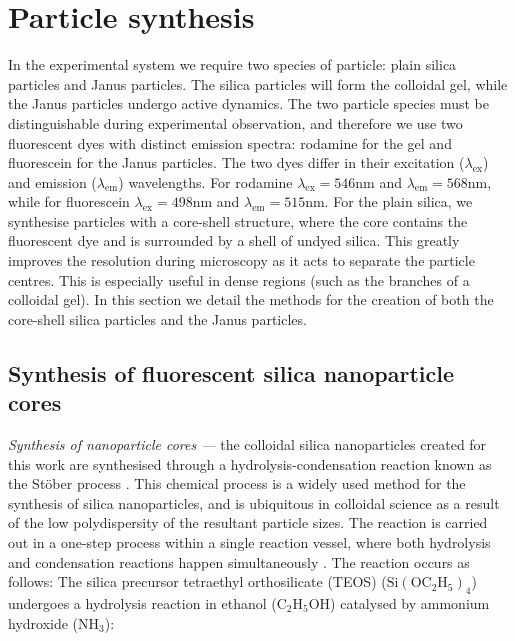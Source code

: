 \section{Particle synthesis}
\label{sec:particle_synthesis}

In the experimental system we require two species of particle: plain silica particles and Janus particles. The silica particles will form the colloidal gel, while the Janus particles undergo active dynamics. The two particle species must be distinguishable during experimental observation, and therefore we use two fluorescent dyes with distinct emission spectra: rodamine for the gel and fluorescein for the Janus particles. 
The two dyes differ in their excitation ($\lambda_{\textrm{ex}}$) and emission ($\lambda_{\textrm{em}}$) wavelengths. For rodamine $\lambda_{\textrm{ex}} = 546$nm and $\lambda_{\textrm{em}} = 568$nm, while for fluorescein $\lambda_{\textrm{ex}} = 498$nm and $\lambda_{\textrm{em}} = 515$nm.
For the plain silica, we synthesise particles with a core-shell structure, where the core contains the fluorescent dye and is surrounded by a shell of undyed silica. This greatly improves the resolution during microscopy as it acts to separate the particle centres. This is especially useful in dense regions (such as the branches of a colloidal gel).
In this section we detail the methods for the creation of both the core-shell silica particles and the Janus particles.


\subsection{Synthesis of fluorescent silica nanoparticle cores}

\textit{Synthesis of nanoparticle cores ---} the colloidal silica nanoparticles created for this work are synthesised through a hydrolysis-condensation reaction known as the St\"{o}ber process \cite{stober1968}. This chemical process is a widely used method for the synthesis of silica nanoparticles, and is ubiquitous in colloidal science as a result of the low polydispersity of the resultant particle sizes. The reaction is carried out in a one-step process within a single reaction vessel, where both hydrolysis and condensation reactions happen simultaneously \cite{vanblaaderen1992,chen1996}. The reaction occurs as follows: 
	The silica precursor tetraethyl orthosilicate (TEOS) ($\mathrm{Si}(\mathrm{OC}_2\mathrm{H}_5)_{4}$) undergoes a hydrolysis reaction in ethanol ($\mathrm{C}_2 \mathrm{H}_5\mathrm{OH}$) catalysed by ammonium hydroxide (NH$_3$):

